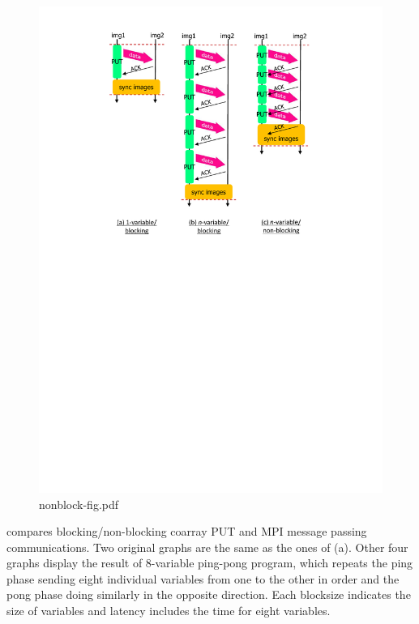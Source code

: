 \begin{figure}[tbh]
  \begin{center}
    \mbox{\includegraphics[trim=43mm 144mm 43mm 3mm, scale=0.6,clip]{figs/nonblock-fig-r2.pdf}}
    \caption{nonblock-fig.pdf}\label{fig:nonblock-fig}
  \end{center}
\end{figure}


 compares blocking/non-blocking coarray PUT and 
MPI message passing communications.
Two original graphs are the same as the ones of  (a).
Other four graphs display the result of 8-variable ping-pong program, 
which repeats the ping phase sending eight individual variables 
from one to the other in order and the pong phase doing similarly 
in the opposite direction.
Each blocksize indicates the size of variables and latency includes the
time for eight variables.

